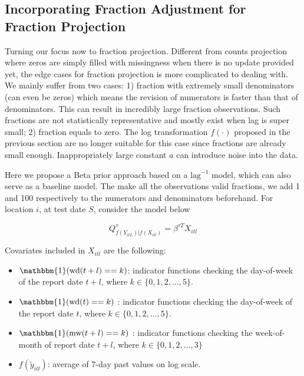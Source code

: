 \subsection{Incorporating Fraction Adjustment for Fraction Projection}
Turning our focus now to fraction projection. Different from counts projection where zeros are simply filled with missingness when there is no update provided yet, the edge cases for fraction projection is more complicated to dealing with. We mainly suffer from two cases: 1) fraction with extremely small denominators (can even be zeros) which means the revision of numerators is faster than that of denominators. This can result in incredibly large fraction observations. Such fractions are not statistically representative and mostly exist when lag is super small; 2) fraction equals to zero. The log transformation $f(\cdot)$ proposed in the previous section are no longer suitable for this case since fractions are already small enough. Inappropriately large constant $a$ can introduce noise into the data\cite{Bosse2023}. 

Here we propose a Beta prior approach based on a $\mbox{lag}^{-1}$ model, which can also serve as a baseline model. The make all the observations valid fractions, we add 1 and 100 respectively to the numerators and denominators beforehand. For location $i$, at test date $S$, consider the model below

$$Q_{f(Y_{itL})|f(X_{itl})}^{\tau}= \beta^{\tau T}X_{itl}$$

Covariates included in $X_{itl}$ are the following:

\begin{itemize}
    \item $\mathbbm{1}(\mbox{wd}(t+l) == k)$: indicator functions checking the day-of-week of the report date $t+l$, where $k \in \{0, 1, 2, ..., 5\}$. 
    \item $\mathbbm{1}(\mbox{wd}(t) == k)$ : indicator functions checking the day-of-week of the report date $t$, where $k \in \{0, 1, 2, ..., 5\}$.
    \item $\mathbbm{1}(\mbox{mw}(t+l) == k)$ : indicator functions checking the week-of-month of report date $t+l$, where $k \in \{0, 1, 2, ...,3\}$
    \item $f(\widetilde{y}_{itl})$: average of 7-day past values on log scale.

\end{itemize}

